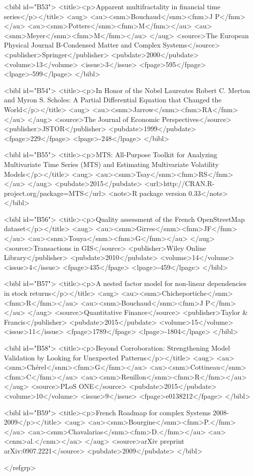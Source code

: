 \documentclass{article}
\begin{document}
{<bibl id="B53">
  <title><p>Apparent multifractality in financial time series</p></title>
  <aug>
    <au><snm>Bouchaud</snm><fnm>J P</fnm></au>
    <au><snm>Potters</snm><fnm>M</fnm></au>
    <au><snm>Meyer</snm><fnm>M</fnm></au>
  </aug>
  <source>The European Physical Journal B-Condensed Matter and Complex
  Systems</source>
  <publisher>Springer</publisher>
  <pubdate>2000</pubdate>
  <volume>13</volume>
  <issue>3</issue>
  <fpage>595</fpage>
  <lpage>-599</lpage>
</bibl>

<bibl id="B54">
  <title><p>In Honor of the Nobel Laureates Robert C. Merton and Myron S.
  Scholes: A Partial Differential Equation that Changed the World</p></title>
  <aug>
    <au><snm>Jarrow</snm><fnm>RA</fnm></au>
  </aug>
  <source>The Journal of Economic Perspectives</source>
  <publisher>JSTOR</publisher>
  <pubdate>1999</pubdate>
  <fpage>229</fpage>
  <lpage>-248</lpage>
</bibl>

<bibl id="B55">
  <title><p>MTS: All-Purpose Toolkit for Analyzing Multivariate Time Series
  (MTS) and Estimating Multivariate Volatility Models</p></title>
  <aug>
    <au><snm>Tsay</snm><fnm>RS</fnm></au>
  </aug>
  <pubdate>2015</pubdate>
  <url>http://CRAN.R-project.org/package=MTS</url>
  <note>R package version 0.33</note>
</bibl>

<bibl id="B56">
  <title><p>Quality assessment of the French OpenStreetMap dataset</p></title>
  <aug>
    <au><snm>Girres</snm><fnm>JF</fnm></au>
    <au><snm>Touya</snm><fnm>G</fnm></au>
  </aug>
  <source>Transactions in GIS</source>
  <publisher>Wiley Online Library</publisher>
  <pubdate>2010</pubdate>
  <volume>14</volume>
  <issue>4</issue>
  <fpage>435</fpage>
  <lpage>-459</lpage>
</bibl>

<bibl id="B57">
  <title><p>A nested factor model for non-linear dependencies in stock
  returns</p></title>
  <aug>
    <au><snm>Chicheportiche</snm><fnm>R</fnm></au>
    <au><snm>Bouchaud</snm><fnm>J P</fnm></au>
  </aug>
  <source>Quantitative Finance</source>
  <publisher>Taylor \& Francis</publisher>
  <pubdate>2015</pubdate>
  <volume>15</volume>
  <issue>11</issue>
  <fpage>1789</fpage>
  <lpage>-1804</lpage>
</bibl>

<bibl id="B58">
  <title><p>Beyond Corroboration: Strengthening Model Validation by Looking for
  Unexpected Patterns</p></title>
  <aug>
    <au><snm>Ch{\'e}rel</snm><fnm>G</fnm></au>
    <au><snm>Cottineau</snm><fnm>C</fnm></au>
    <au><snm>Reuillon</snm><fnm>R</fnm></au>
  </aug>
  <source>PLoS ONE</source>
  <pubdate>2015</pubdate>
  <volume>10</volume>
  <issue>9</issue>
  <fpage>e0138212</fpage>
</bibl>

<bibl id="B59">
  <title><p>{French Roadmap for complex Systems 2008-2009}</p></title>
  <aug>
    <au><snm>{Bourgine}</snm><fnm>P.</fnm></au>
    <au><snm>{Chavalarias}</snm><fnm>D.</fnm></au>
    <au><cnm>al.</cnm></au>
  </aug>
  <source>arXiv preprint arXiv:0907.2221</source>
  <pubdate>2009</pubdate>
</bibl>

</refgrp>
} %
\end{document}
